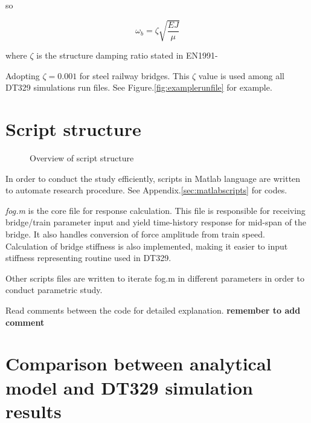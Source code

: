 so 

\begin{equation}
    \omega_b = \zeta \sqrt{\frac{EJ}{\mu}}
\end{equation}

where $\zeta$ is the structure damping ratio stated in EN1991-

Adopting $\zeta = 0.001$ for steel railway bridges. This $\zeta$ value is used among all DT329 simulations run files. See Figure.\ref{fig:examplerunfile} for example.

\section{Script structure}
\begin{figure}[h]
\centering
{}

\caption{Overview of script structure }
\label{fig:scriptstructure}
\end{figure}

In order to conduct the study efficiently, scripts in Matlab language are written to automate research procedure. See Appendix.\ref{sec:matlabscripts} for codes.

\textit{fog.m} is the core file for response calculation. This file is responsible for receiving bridge/train parameter input and yield time-history response for mid-span of the bridge. It also handles conversion of force amplitude from train speed. Calculation of bridge stiffness is also implemented, making it easier to input stiffness representing routine used in DT329.

Other scripts files are written to iterate fog.m in different parameters in order to conduct parametric study.

Read comments between the code for detailed explanation.
\textbf{remember to add comment}

\section{Comparison between analytical model and DT329 simulation results}


